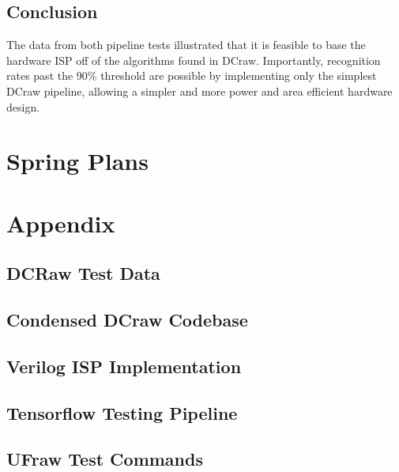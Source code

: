 \documentclass{report}
\begin{document}
	\section{Conclusion}
	The data from both pipeline tests illustrated that it is feasible to base the hardware ISP off of the algorithms found in DCraw. Importantly, recognition rates past the 90\% threshold are possible by implementing only the simplest DCraw pipeline, allowing a simpler and more power and area efficient hardware design.

\chapter{Spring Plans}

\chapter{Appendix}

\section{DCRaw Test Data} \label{dcrawdata}

\section{Condensed DCraw Codebase}

\section{Verilog ISP Implementation}

\section{Tensorflow Testing Pipeline} \label{pipelinecode}

\section{UFraw Test Commands} \label{ufrawcommands}
\end{document}
